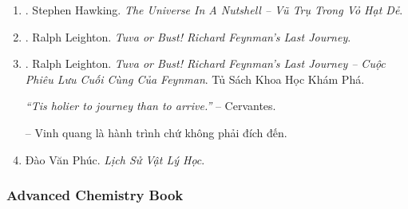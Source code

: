 \documentclass{article}
\begin{document}
\begin{enumerate}
	\item \cite{Hawking_vttvhd}. {\sc Stephen Hawking}. {\it The Universe In A Nutshell -- Vũ Trụ Trong Vỏ Hạt Dẻ}.\hfill{\sf[done]}
	
	\item \cite{Leighton_Feyman_last_journey}. {\sc Ralph Leighton}. {\it Tuva or Bust! Richard Feynman's Last Journey}.
	
	\item \cite{Leighton_Feyman_last_journey_VN}. {\sc Ralph Leighton}. {\it Tuva or Bust! Richard Feynman's Last Journey -- Cuộc Phiêu Lưu Cuối Cùng Của Feynman}. Tủ Sách Khoa Học Khám Phá.\hfill{\sf[done]}
	
	{\it``Tis holier to journey than to arrive.''} -- {\sc Cervantes.}
	
	-- Vinh quang là hành trình chứ không phải đích đến. \cite[Suy ngẫm 2000, p. 269]{Leighton_Feyman_last_journey_VN}
	\item Đào Văn Phúc. {\it Lịch Sử Vật Lý Học}.
\end{enumerate}


\subsubsection{Advanced Chemistry Book}
\end{document}
